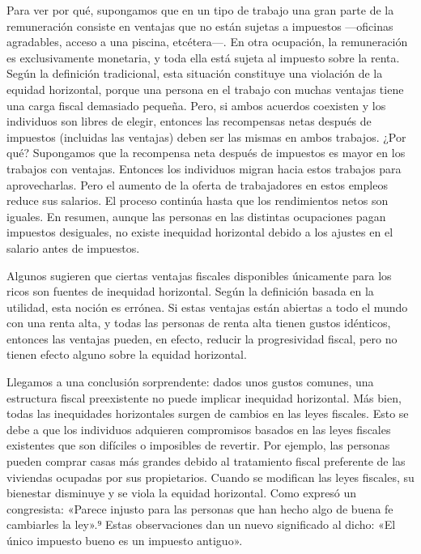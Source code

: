 \documentclass[10pt,a4paper]{article}
\begin{document}
Para ver por qué, supongamos que en un tipo de trabajo una gran parte de la remuneración consiste en ventajas que no están sujetas a impuestos —oficinas agradables, acceso a una piscina, etcétera—. En otra ocupación, la remuneración es exclusivamente monetaria, y toda ella está sujeta al impuesto sobre la renta. Según la definición tradicional, esta situación constituye una violación de la equidad horizontal, porque una persona en el trabajo con muchas ventajas tiene una carga fiscal demasiado pequeña. Pero, si ambos acuerdos coexisten y los individuos son libres de elegir, entonces las recompensas netas después de impuestos (incluidas las ventajas) deben ser las mismas en ambos trabajos. ¿Por qué? Supongamos que la recompensa neta después de impuestos es mayor en los trabajos con ventajas. Entonces los individuos migran hacia estos trabajos para aprovecharlas. Pero el aumento de la oferta de trabajadores en estos empleos reduce sus salarios. El proceso continúa hasta que los rendimientos netos son iguales. En resumen, aunque las personas en las distintas ocupaciones pagan impuestos desiguales, no existe inequidad horizontal debido a los ajustes en el salario antes de impuestos.

Algunos sugieren que ciertas ventajas fiscales disponibles únicamente para los ricos son fuentes de inequidad horizontal. Según la definición basada en la utilidad, esta noción es errónea. Si estas ventajas están abiertas a todo el mundo con una renta alta, y todas las personas de renta alta tienen gustos idénticos, entonces las ventajas pueden, en efecto, reducir la progresividad fiscal, pero no tienen efecto alguno sobre la equidad horizontal.

Llegamos a una conclusión sorprendente: dados unos gustos comunes, una estructura fiscal preexistente no puede implicar inequidad horizontal. Más bien, todas las inequidades horizontales surgen de cambios en las leyes fiscales. Esto se debe a que los individuos adquieren compromisos basados en las leyes fiscales existentes que son difíciles o imposibles de revertir. Por ejemplo, las personas pueden comprar casas más grandes debido al tratamiento fiscal preferente de las viviendas ocupadas por sus propietarios. Cuando se modifican las leyes fiscales, su bienestar disminuye y se viola la equidad horizontal. Como expresó un congresista: «Parece injusto para las personas que han hecho algo de buena fe cambiarles la ley».⁹ Estas observaciones dan un nuevo significado al dicho: «El único impuesto bueno es un impuesto antiguo».
\end{document}
